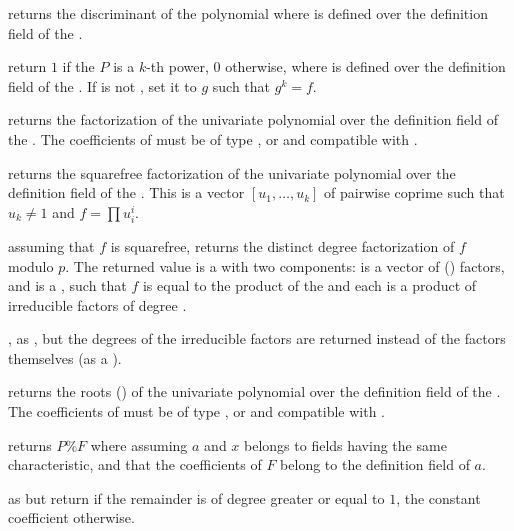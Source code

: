  returns the discriminant of the polynomial
 where  is defined over the definition field of the 
.

return $1$ if the  $P$ is a $k$-th power, $0$ otherwise,
where  is defined over the definition field of the  .
If  is not , set it to $g$ such that $g^k = f$.

 returns the factorization of the univariate
polynomial  over the definition field of the  . The
coefficients of  must be of type ,  or 
and compatible with .

 returns the squarefree
factorization of the univariate polynomial  over the definition field of
the  .  This is a vector $[u_1,\dots,u_k]$ of pairwise
coprime  such that $u_k \neq 1$ and $f = \prod u_i^i$.

 assuming that $f$ is squarefree,
returns the distinct degree factorization of $f$ modulo $p$.
The returned value  is a  with two
components:  is a vector of ()
factors, and  is a , such that
$f$ is equal to the product of the  and each 
is a product of irreducible factors of degree .

, as , but the
degrees of the irreducible factors are returned instead of the factors
themselves (as a ).

 returns the roots ()
of the univariate polynomial  over the definition field of the
 . The coefficients of  must be of type ,
 or  and compatible with .

 returns $P\%F$
where  assuming $a$ and $x$ belongs to fields having the same
characteristic, and that the coefficients of $F$ belong to the definition
field of $a$.

 as 
but return  if the remainder is of degree greater or equal to $1$,
the constant coefficient otherwise.


